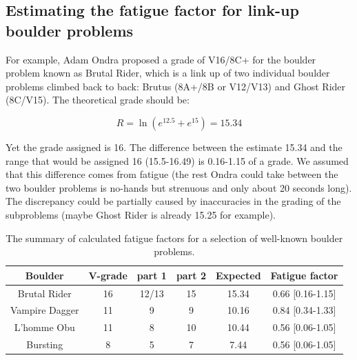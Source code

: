 \documentclass[11pt]{article}
\begin{document}
\subsection*{Estimating the fatigue factor for link-up boulder problems}


For example, Adam Ondra proposed a grade of V16/8C+ for the boulder problem known as Brutal Rider, which is a link up of two individual boulder problems climbed back to back: Brutus (8A+/8B or V12/V13) and Ghost Rider (8C/V15). The theoretical grade should be:

\begin{equation}
R = \ln \left(e^{12.5} + e^{15}\right) = 15.34
\end{equation} 

Yet the grade assigned is 16. The difference between the estimate 15.34 and the range that would be assigned 16 (15.5-16.49)  is 0.16-1.15 of a grade. We assumed that this difference comes from fatigue (the rest Ondra could take between the two boulder problems is no-hands but strenuous and only about 20 seconds long). The discrepancy could be partially caused by inaccuracies in the grading of the subproblems (maybe Ghost Rider is already 15.25 for example).

\begin{table}
\centering
\begin{tabular}{| c | c | c | c | c | c |}
  \hline			
  {\bf Boulder } & {\bf V-grade} & {\bf part 1} & {\bf part 2} & {\bf Expected} & {\bf Fatigue factor } \\
  \hline			
  Brutal Rider & 16 & 12/13 & 15 & 15.34 & 0.66 [0.16-1.15]\\
  Vampire Dagger & 11 & 9 & 9 & 10.16 & 0.84 [0.34-1.33]\\
  L'homme Obu & 11 & 8 & 10 & 10.44 & 0.56 [0.06-1.05]\\
  Bursting & 8 & 5 & 7 & 7.44 & 0.56 [0.06-1.05]\\
  \hline  
\end{tabular}
\caption{The summary of calculated fatigue factors for a selection of well-known boulder problems. }
\label{table2}
\end{table}




\end{document}
